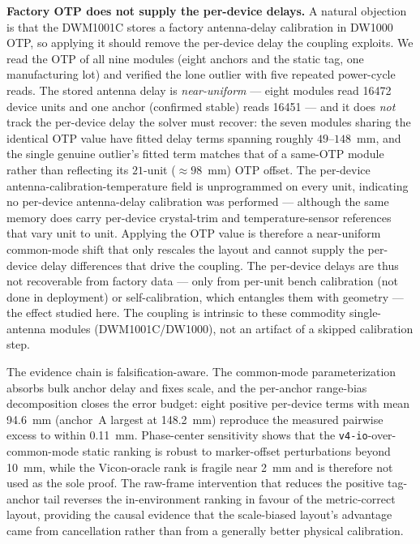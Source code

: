\documentclass[11pt,a4paper]{article}
\begin{document}
\textbf{Factory OTP does not supply the per-device delays.} A natural objection is that the
DWM1001C stores a factory antenna-delay calibration in DW1000 OTP, so applying it should remove the
per-device delay the coupling exploits. We read the OTP of all nine modules (eight anchors and the
static tag, one manufacturing lot) and verified the lone outlier with five repeated power-cycle reads.
The stored antenna delay is \emph{near-uniform} --- eight modules read 16472 device units and one
anchor (confirmed stable) reads 16451 --- and it does \emph{not} track the per-device delay the solver
must recover: the seven modules sharing the identical OTP value have fitted delay terms spanning
roughly $49$--$148$~mm, and the single genuine outlier's fitted term matches that of a same-OTP module
rather than reflecting its $21$-unit ($\approx 98$~mm) OTP offset. The per-device
antenna-calibration-temperature field is unprogrammed on every unit, indicating no per-device
antenna-delay calibration was performed --- although the same memory does carry per-device crystal-trim
and temperature-sensor references that vary unit to unit. Applying the OTP value is therefore a
near-uniform common-mode shift that only rescales the layout and cannot supply the per-device delay
differences that drive the coupling. The per-device delays are thus not recoverable from factory data --- only from
per-unit bench calibration (not done in deployment) or self-calibration, which
entangles them with geometry --- the effect studied here. The coupling is intrinsic to these commodity single-antenna modules (DWM1001C/DW1000), not an
artifact of a skipped calibration step.

The evidence chain is falsification-aware. The common-mode parameterization
absorbs bulk anchor delay and fixes scale, and the per-anchor range-bias decomposition
closes the error budget: eight positive per-device terms with mean 94.6~mm (anchor~A
largest at 148.2~mm) reproduce the measured pairwise excess to within 0.11~mm.
Phase-center sensitivity shows that the \texttt{v4-io}-over-common-mode static ranking
is robust to marker-offset perturbations beyond 10~mm, while the Vicon-oracle rank is
fragile near 2~mm and is therefore not used as the sole proof. The raw-frame
intervention that reduces the positive tag-anchor tail reverses the in-environment
ranking in favour of the metric-correct layout, providing the causal evidence that the
scale-biased layout's advantage came from cancellation rather than from a generally better
physical calibration.
\end{document}
